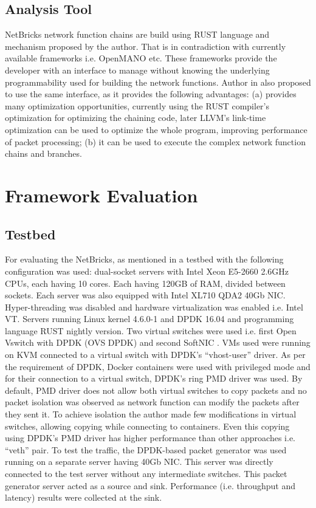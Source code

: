 \documentclass[10pt, a4paper, conference]{IEEEtran}
\begin{document}
\subsection{Analysis Tool}
NetBricks network function chains are build using RUST language and mechanism proposed by the author. That is in contradiction with currently available frameworks i.e. OpenMANO etc. These frameworks provide the developer with an interface to manage without knowing the underlying programmability used for building the network functions. Author in \cite{Panda2016} also proposed to use the same interface, as it provides the following advantages: (a) provides many optimization opportunities, currently using the RUST compiler’s optimization for optimizing the chaining code, later LLVM’s link-time optimization \cite{Lattner} can be used to optimize the whole program, improving performance of packet processing; (b) it can be used to execute the complex network function chains and branches.
\section{Framework Evaluation}
\subsection{Testbed}
For evaluating the NetBricks, as mentioned in a \cite{Panda2016} testbed with the following configuration was used: dual-socket servers with Intel Xeon E5-2660 2.6GHz CPUs, each having 10 cores. Each having 120GB of RAM, divided between sockets. Each server was also equipped with Intel XL710 QDA2 40Gb NIC. Hyper-threading was disabled and hardware virtualization was enabled i.e. Intel VT. Servers running Linux kernel 4.6.0-1 and DPDK 16.04 and programming language RUST nightly version. Two virtual switches were used i.e. first Open Vswitch with DPDK (OVS DPDK) \cite{Gross2014} and second SoftNIC \cite{Han:EECS-2015-155}. VMs used were running on KVM connected to a virtual switch with DPDK’s “vhost-user” driver. As per the requirement of DPDK, Docker containers were used with privileged mode and for their connection to a virtual switch, DPDK’s ring PMD driver was used. By default, PMD driver does not allow both virtual switches to copy packets and no packet isolation was observed as network function can modify the packets after they sent it. To achieve isolation the author made few modifications in virtual switches, allowing copying while connecting to containers. Even this copying using DPDK’s PMD driver has higher performance than other approaches i.e. “veth” pair. To test the traffic, the DPDK-based packet generator was used running on a separate server having 40Gb NIC. This server was directly connected to the test server without any intermediate switches. This packet generator server acted as a source and sink. Performance (i.e. throughput and latency) results were collected at the sink.
\end{document}
